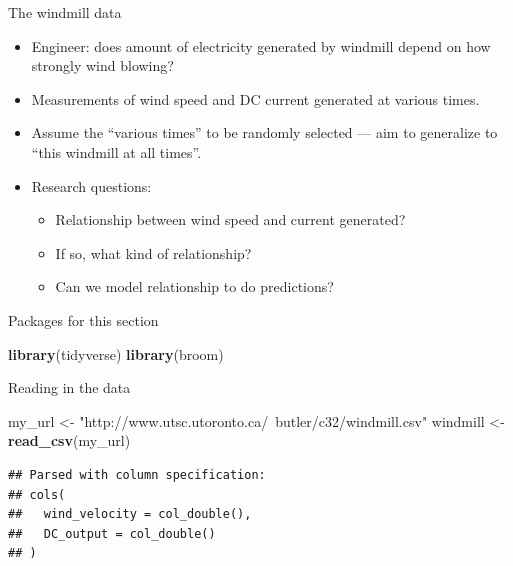 \documentclass[ignorenonframetext,]{beamer}
\newenvironment{Shaded}{\begin{snugshade}}{\end{snugshade}}
\newcommand{\KeywordTok}[1]{\textcolor[rgb]{0.13,0.29,0.53}{\textbf{#1}}}
\newcommand{\NormalTok}[1]{#1}
\newcommand{\StringTok}[1]{\textcolor[rgb]{0.31,0.60,0.02}{#1}}
\providecommand{\tightlist}{%
  \setlength{\itemsep}{0pt}\setlength{\parskip}{0pt}}
\begin{document}
\begin{frame}{The windmill data}
\protect\hypertarget{the-windmill-data}{}

\begin{itemize}
\tightlist
\item
  Engineer: does amount of electricity generated by windmill depend on
  how strongly wind blowing?
\item
  Measurements of wind speed and DC current generated at various times.
\item
  Assume the ``various times'' to be randomly selected --- aim to
  generalize to ``this windmill at all times''.
\item
  Research questions:

  \begin{itemize}
  \tightlist
  \item
    Relationship between wind speed and current generated?
  \item
    If so, what kind of relationship?
  \item
    Can we model relationship to do predictions?
  \end{itemize}
\end{itemize}

\end{frame}

\begin{frame}[fragile]{Packages for this section}
\protect\hypertarget{packages-for-this-section-5}{}

\begin{Shaded}
\begin{Highlighting}[]
\KeywordTok{library}\NormalTok{(tidyverse)}
\KeywordTok{library}\NormalTok{(broom)}
\end{Highlighting}
\end{Shaded}

\end{frame}

\begin{frame}[fragile]{Reading in the data}
\protect\hypertarget{reading-in-the-data}{}

\begin{Shaded}
\begin{Highlighting}[]
\NormalTok{my_url <-}\StringTok{ "http://www.utsc.utoronto.ca/~butler/c32/windmill.csv"}
\NormalTok{windmill <-}\StringTok{ }\KeywordTok{read_csv}\NormalTok{(my_url)}
\end{Highlighting}
\end{Shaded}

\begin{verbatim}
## Parsed with column specification:
## cols(
##   wind_velocity = col_double(),
##   DC_output = col_double()
## )
\end{verbatim}

\end{frame}
\end{document}
